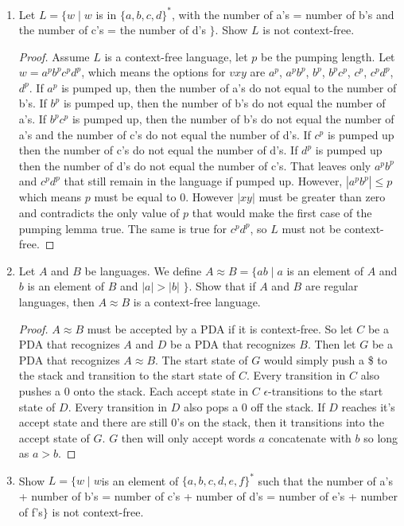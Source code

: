 \documentclass{article}
\begin{document}
\begin{enumerate}
\begin{proof}
            \end{proof}
        \item Let $L=\{w\mid w $ is in $\{a,b,c,d\}^*$, with the number of a's = number of b's and the number of c's = the number of d's $\}$. Show $L$ is not context-free.
            \begin{proof}
                Assume $L$ is a context-free language, let $p$ be the pumping length. Let $w=a^pb^pc^pd^p$, which means the options for $vxy$ are $a^p$, $a^pb^p$, $b^p$, $b^pc^p$, $c^p$, $c^pd^p$, $d^p$. If $a^p$ is pumped up, then the number of a's do not equal to the number of b's. If $b^p$ is pumped up, then the number of b's do not equal the number of a's. If $b^pc^p$ is pumped up, then the number of b's do not equal the number of a's and the number of c's do not equal the number of d's. If $c^p$ is pumped up then the number of c's do not equal the number of d's. If $d^p$ is pumped up then the number of d's do not equal the number of c's. That leaves only $a^pb^p$ and $c^pd^p$ that still remain in the language if pumped up. However, $|a^pb^p| \leq p$ which means $p$ must be equal to 0. However $|xy|$ must be greater than zero and contradicts the only value of $p$ that would make the first case of the pumping lemma true. The same is true for $c^pd^p$, so $L$ must not be context-free.
            \end{proof}
        \item Let $A$ and $B$ be languages. We define $A\approx B = \{ab \mid a $ is an element of $A$ and $b$ is an element of $B$ and $|a| > |b|$ $\}$. Show that if $A$ and $B$ are regular languages, then $A\approx B$ is a context-free language.
            \begin{proof}
                $A\approx B$ must be accepted by a PDA if it is context-free. So let $C$ be a PDA that recognizes $A$ and $D$ be a PDA that recognizes $B$. Then let $G$ be a PDA that recognizes $A\approx B$. The start state of $G$ would simply push a \$ to the stack and transition to the start state of $C$. Every transition in $C$ also pushes a 0 onto the stack. Each accept state in $C$ $\epsilon$-transitions to the start state of $D$. Every transition in $D$ also pops a 0 off the stack. If $D$ reaches it's accept state and there are still 0's on the stack, then it transitions into the accept state of $G$. $G$ then will only accept words $a$ concatenate with $b$ so long as $a>b$.
            \end{proof}
        \item Show $L = \{w\mid w $is an element of $\{a,b,c,d,e,f\}^*$ such that the number of a's + number of b's = number of c's + number of d's = number of e's + number of f's$ \}$ is not context-free.
    \end{enumerate}
\end{document}

